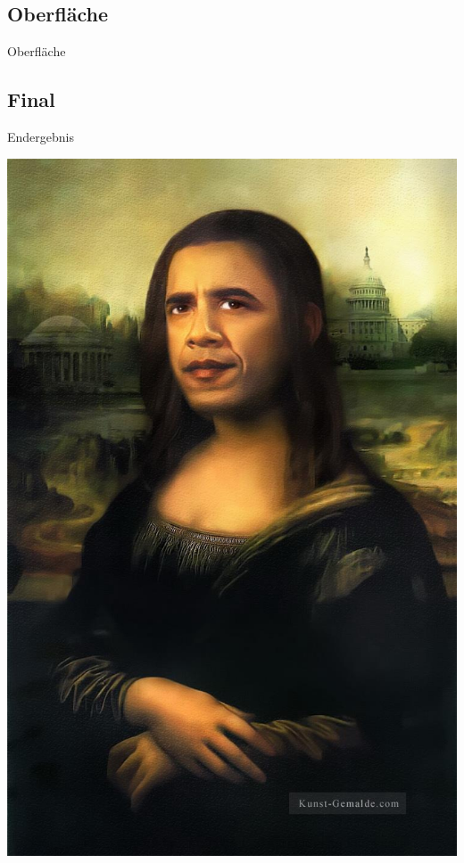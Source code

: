 \documentclass[19pt]{beamer}
\begin{document}
\subsection{Oberfläche}
\begin{frame}{Oberfläche}
\end{frame}

\subsection{Final}
\begin{frame}{Endergebnis}
\begin{center}
\includegraphics[scale=0.2]{resources/final.jpg}
\end{center}
\end{frame}
\end{document}

